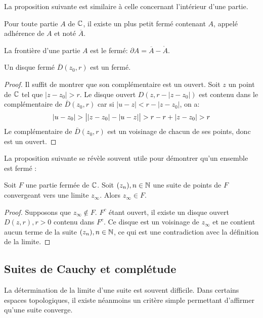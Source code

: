 La proposition suivante est similaire à celle concernant l'intérieur d'une partie. 
\begin{fprop}
	Pour toute partie $A$ de $\mathbb{C}$, il existe un plus petit fermé contenant $A$, appelé adhérence de $A$ et noté $\overline{A}$.
\end{fprop}
\begin{fdefn}
	La frontière d'une partie $A$ est le fermé: $\partial A = \overline{A}-\mathring{A}$. 
\end{fdefn}
\begin{prop}
	Un disque fermé $\overline{D}(z_0,r)$ est un fermé.
\end{prop}
\begin{proof}
	Il suffit de montrer que son complémentaire est un ouvert. Soit $z$ un point de $\mathbb{C}$ tel que $|z-z_0|>r$. Le disque ouvert $D(z,r-|z-z_0|)$ est contenu dans le complémentaire de $\overline{D}(z_0,r)$ car si $|u-z| < r - |z -z_0|$, on a:
	\[
	|u-z_0| > \left | \strut |z-z_0| - |u-z| \right | > r -r + |z-z_0| > r
	\]
	Le complémentaire de  $\overline{D}(z_0,r)$ est un voisinage de chacun de ses points, donc est un ouvert.
\end{proof}

La proposition suivante se révèle souvent utile pour démontrer qu'un ensemble est fermé :
\begin{fprop}
	Soit $F$ une partie fermée de $\mathbb{C}$. Soit $(z_n), n \in {\mathbb N}$ une suite de points de $F$ convergeant vers une limite $z_\infty$. Alors $z_\infty \in F$.
\end{fprop}
\begin{proof}
	Supposons que $z_\infty \notin F$. $F^c$ étant ouvert, il existe un disque ouvert $D(z,r), r> 0$ contenu dans $F^c$. Ce disque est un voisinage de $z_\infty$ et ne contient aucun terme de la suite $(z_n), n \in {\mathbb N}$, ce qui est une contradiction avec la définition de la limite. 
\end{proof}
\subsection{Suites de Cauchy et complétude}
La détermination de la limite d'une suite est souvent difficile. Dans certains espaces topologiques, il existe néanmoins un critère simple permettant d'affirmer qu'une suite converge.

